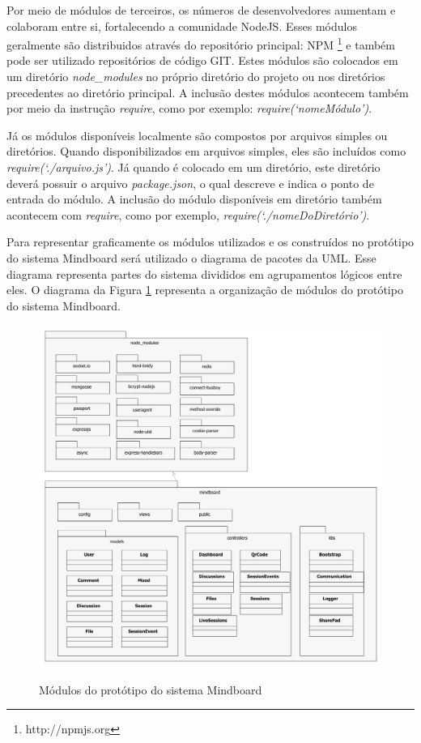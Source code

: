 Por meio de módulos de terceiros, os números de desenvolvedores aumentam e colaboram entre si, fortalecendo a comunidade NodeJS. Esses módulos geralmente são distribuidos através do repositório principal: NPM \footnote{http://npmjs.org} e também pode ser utilizado repositórios de código GIT. Estes módulos são colocados em um diretório \emph{node\_modules} no próprio diretório do projeto ou nos diretórios precedentes ao diretório principal. A inclusão destes módulos acontecem também por meio da instrução \emph{require}, como por exemplo: \emph{require(`nomeMódulo')}.

Já os módulos disponíveis localmente são compostos por arquivos simples ou diretórios. Quando disponibilizados em arquivos simples, eles são incluídos como \emph{require(`./arquivo.js')}. Já quando é colocado em um diretório, este diretório deverá possuir o arquivo \emph{package.json}, o qual descreve e indica o ponto de entrada do módulo. A inclusão do módulo disponíveis em diretório também acontecem com \emph{require}, como por exemplo, \emph{require(`./nomeDoDiretório')}.

Para representar graficamente os módulos utilizados e os construídos no protótipo do sistema Mindboard será utilizado o diagrama de pacotes da UML. Esse diagrama representa partes do sistema divididos em agrupamentos lógicos entre eles. O diagrama da Figura \ref{fig:modulos} representa a organização de módulos do protótipo do sistema Mindboard.


\begin{figure}[h]
\centering
\caption{Módulos do protótipo do sistema Mindboard}
\includegraphics[width=1.0\textwidth]{pdfs/modulos.pdf} 
\label{fig:modulos} 
\end{figure}

